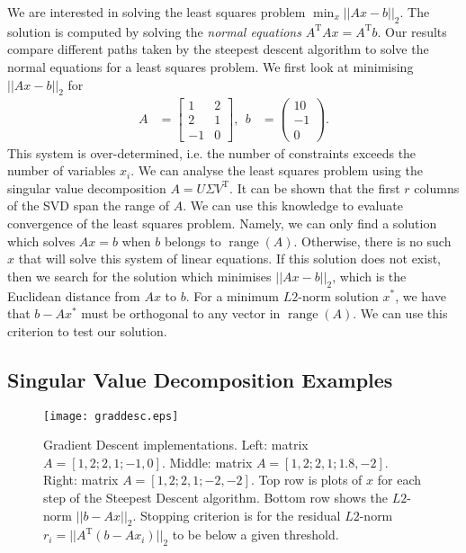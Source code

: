 \documentclass{article}
\begin{document}
We are interested in solving the {least squares problem} $\min_{x} ||{Ax}-{b}||_2$.
The solution is computed by solving the \textit{normal equations} ${A}^\mathrm{T}{Ax} = {A}^\mathrm{T}{b}$.
Our results compare different paths taken by the steepest descent algorithm to solve the normal equations for a least squares problem.
We first look at minimising $||Ax - b||_2$ for
\begin{eqnarray*}
    A &= \begin{bmatrix}
        1 & 2 \\
        2 & 1 \\
        -1 & 0
    \end{bmatrix},~~  b &= \begin{pmatrix}
        10 \\
        -1 \\
        0
    \end{pmatrix}.
\end{eqnarray*}
This system is over-determined, i.e. the number of constraints exceeds the number of variables $x_i$.
We can analyse the least squares problem using the singular value decomposition $A = U \Sigma V^\mathrm{T}$.
It can be shown that the first $r$ columns of the SVD span the range of $A$.
We can use this knowledge to evaluate convergence of the least squares problem.
Namely, we can only find a solution which solves $Ax = b$ when $b$ belongs to $\operatorname{range}(A)$.
Otherwise, there is no such $x$ that will solve this system of linear equations.
If this solution does not exist, then we search for the solution which minimises $||Ax-b||_2$,
which is the Euclidean distance from $Ax$ to $b$.
For a minimum $L2$-norm solution $x^*$, we have that $b-Ax^*$ must be orthogonal to any vector in $\operatorname{range}(A)$.
We can use this criterion to test our solution.

\subsection{Singular Value Decomposition Examples}
\begin{figure}
    \centering
    \texttt{[image: graddesc.eps]}
    \caption{
        Gradient Descent implementations. Left: matrix $A = [1, 2; 2, 1; -1, 0]$.
        Middle: matrix $A = [1, 2; 2, 1; 1.8, -2]$.
        Right: matrix $A = [1, 2; 2, 1; -2, -2]$.
        Top row is plots of $x$ for each step of the Steepest Descent algorithm.
        Bottom row shows the $L2$-norm $||b-Ax||_2$.
        Stopping criterion is for the residual $L2$-norm $r_i = ||A^\mathrm{T}(b - Ax_i)||_2$ to be below a given threshold.
    }
    \label{fig:graddesc}
\end{figure}
\end{document}
